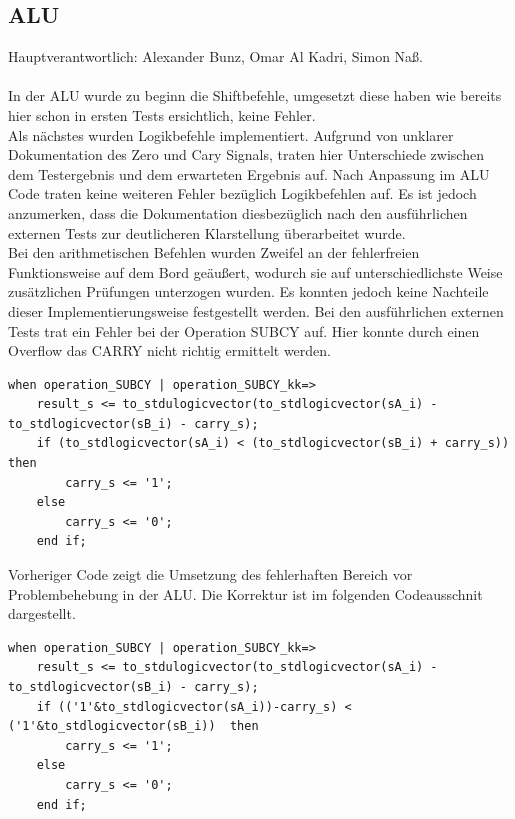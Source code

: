 \documentclass[bibliography=totoc,listof=totoc,index=totoc]{scrartcl}
\begin{document}
\subsection{ALU}
Hauptverantwortlich: Alexander Bunz, Omar Al Kadri, Simon Naß.\\\\
In der ALU wurde zu beginn die Shiftbefehle, umgesetzt diese haben wie bereits hier schon in ersten Tests ersichtlich, keine Fehler. \\
Als nächstes wurden Logikbefehle implementiert. Aufgrund von unklarer Dokumentation des Zero und Cary Signals, traten hier Unterschiede zwischen dem Testergebnis und dem erwarteten Ergebnis auf. Nach Anpassung im ALU Code traten keine weiteren Fehler bezüglich Logikbefehlen auf. Es ist jedoch anzumerken, dass die Dokumentation diesbezüglich nach den ausführlichen externen Tests zur deutlicheren Klarstellung überarbeitet wurde. \\
Bei den arithmetischen Befehlen wurden Zweifel an der fehlerfreien Funktionsweise auf dem Bord geäußert, wodurch sie auf unterschiedlichste Weise zusätzlichen Prüfungen unterzogen wurden. Es konnten jedoch keine Nachteile dieser Implementierungsweise festgestellt werden. Bei den ausführlichen externen Tests trat ein Fehler bei der Operation SUBCY auf. Hier konnte durch einen Overflow das CARRY nicht richtig ermittelt werden. 
\begin{small}
\begin{verbatim}
when operation_SUBCY | operation_SUBCY_kk=>
	result_s <= to_stdulogicvector(to_stdlogicvector(sA_i) - to_stdlogicvector(sB_i) - carry_s);
	if (to_stdlogicvector(sA_i) < (to_stdlogicvector(sB_i) + carry_s)) then 
		carry_s <= '1';
	else
		carry_s <= '0';
	end if;
\end{verbatim}
\end{small}
Vorheriger Code zeigt die Umsetzung des fehlerhaften Bereich vor Problembehebung in der ALU. Die Korrektur ist im folgenden Codeausschnit dargestellt.\\
\begin{small}
\begin{verbatim}
when operation_SUBCY | operation_SUBCY_kk=>
	result_s <= to_stdulogicvector(to_stdlogicvector(sA_i) - to_stdlogicvector(sB_i) - carry_s);
	if (('1'&to_stdlogicvector(sA_i))-carry_s) < ('1'&to_stdlogicvector(sB_i))  then 
		carry_s <= '1';
	else
		carry_s <= '0';
	end if;
\end{verbatim}
\end{small}
\end{document}
